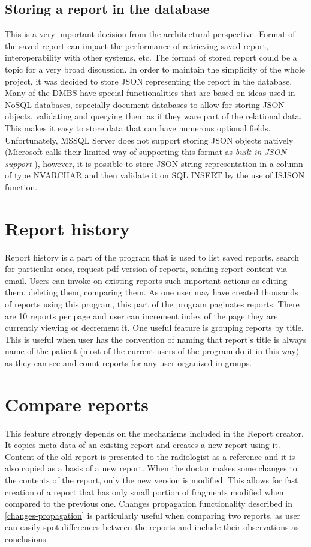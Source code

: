\documentclass[12pt, twoside, openany]{report}
\theoremstyle{definition}
\begin{document}
\subsection{Storing a report in the database}
This is a very important decision from the architectural perspective. Format of the saved report can impact the performance of retrieving saved report, interoperability with other systems, etc. The format of stored report could be a topic for a very broad discussion. In order to maintain the simplicity of the whole project, it was decided to store JSON representing the report in the database. Many of the DMBS have special functionalities that are based on ideas used in NoSQL databases, especially document databases to allow for storing JSON objects, validating and querying them as if they ware part of the relational data. This makes it easy to store data that can have numerous optional fields. Unfortunately, MSSQL Server does not support storing JSON objects natively (Microsoft calls their limited way of supporting this format as \textit{built-in JSON support} \cite{microsoft-json-support}), however, it is possible to store JSON string representation in a column of type NVARCHAR and then validate it on SQL INSERT by the use of ISJSON function.

\section{Report history}
Report history is a part of the program that is used to list saved reports, search for particular ones, request pdf version of reports, sending report content via email. Users can invoke on existing reports such important actions as editing them, deleting them, comparing them. As one user may have created thousands of reports using this program, this part of the program paginates reports. There are 10 reports per page and user can increment index of the page they are currently viewing or decrement it. 
One useful feature is grouping reports by title. This is useful when user has the convention of naming that report's title is always name of the patient (most of the current users of the program do it in this way) as they can see and count reports for any user organized in groups. 

\section{Compare reports}
This feature strongly depends on the mechanisms included in the Report creator. It copies meta-data of an existing report and creates a new report using it. Content of the old report is presented to the radiologist as a reference and it is also copied as a basis of a new report. When the doctor makes some changes to the contents of the report, only the new version is modified. This allows for fast creation of a report that has only small portion of fragments modified when compared to the previous one.
Changes propagation functionality described in \ref{changes-propagation} is particularly useful when comparing two reports, as user can easily spot differences between the reports and include their observations as conclusions.
\end{document}
